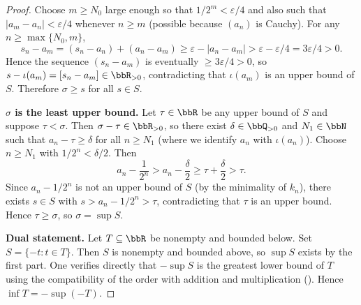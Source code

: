 \begin{proof}
    Choose $m \ge N_0$ large enough so that $1/2^m < \varepsilon/4$ and also such that $|a_m - a_n| < \varepsilon/4$ whenever $n \ge m$ (possible because $(a_n)$ is Cauchy). For any $n \ge \max\{N_0, m\}$,
    $$s_n - a_m = (s_n - a_n) + (a_n - a_m) \ge \varepsilon - |a_n - a_m| > \varepsilon - \varepsilon/4 = 3\varepsilon/4 > 0.$$
    Hence the sequence $(s_n - a_m)$ is eventually $\ge 3\varepsilon/4 > 0$, so $s - \iota(a_m) = [s_n - a_m] \in \bbR_{>0}$, contradicting that $\iota(a_m)$ is an upper bound of $S$. Therefore $\sigma \ge s$ for all $s \in S$.

    \textbf{$\sigma$ is the least upper bound.}
    Let $\tau \in \bbR$ be any upper bound of $S$ and suppose $\tau < \sigma$. Then $\sigma - \tau \in \bbR_{>0}$, so there exist $\delta \in \bbQ_{>0}$ and $N_1 \in \bbN$ such that $a_n - \tau \ge \delta$ for all $n \ge N_1$ (where we identify $a_n$ with $\iota(a_n)$). Choose $n \ge N_1$ with $1/2^n < \delta/2$. Then
    $$a_n - \frac{1}{2^n} > a_n - \frac{\delta}{2} \ge \tau + \frac{\delta}{2} > \tau.$$
    Since $a_n - 1/2^n$ is not an upper bound of $S$ (by the minimality of $k_n$), there exists $s \in S$ with $s > a_n - 1/2^n > \tau$, contradicting that $\tau$ is an upper bound. Hence $\tau \ge \sigma$, so $\sigma = \sup S$.

    \textbf{Dual statement.}
    Let $T \subseteq \bbR$ be nonempty and bounded below. Set $S = \{-t : t \in T\}$. Then $S$ is nonempty and bounded above, so $\sup S$ exists by the first part. One verifies directly that $-\sup S$ is the greatest lower bound of $T$ using the compatibility of the order with addition and multiplication (). Hence $\inf T = -\sup(-T)$.
\end{proof}